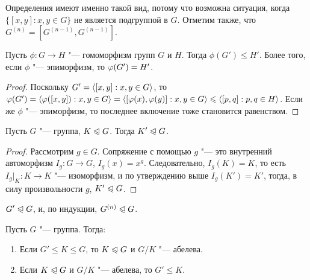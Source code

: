 \begin{note}
	Определения имеют именно такой вид, потому что возможна ситуация, когда $\{[x, y]: x, y \in G\}$ не является подгруппой в $G$. Отметим также, что $G^{(n)} = [G^{(n - 1)}, G^{(n - 1)}]$.
\end{note}

\begin{proposition}
	Пусть $\phi: G \to H$ "--- гомоморфизм групп $G$ и $H$. Тогда $\phi(G') \le H'$. Более того, если $\phi$ "--- эпиморфизм, то $\phi(G') \hm= H'$.
\end{proposition}

\begin{proof}
	Поскольку $G' = \langle[x, y]: x, y \in G\rangle$, то $\phi(G') \hm= \gl\phi([x, y]): x, y \in G\gr \hm= \gl[\phi(x), \phi(y)]: x, y \in G\gr \le \gl[p, q]: p, q \hm\in H\gr$. Если же $\phi$ "--- эпиморфизм, то последнее включение тоже становится равенством.
\end{proof}

\begin{corollary}
	Пусть $G$ "--- группа, $K \trianglelefteqslant G$. Тогда $K' \trianglelefteqslant G$.
\end{corollary}

\begin{proof}
	Рассмотрим $g \in G$. Сопряжение с помощью $g$ "--- это внутренний автоморфизм $I_g: G \to G$, $I_g(x) = x^g$. Следовательно, $I_g(K) = K$, то есть $I_g|_K : K \to K$ "--- изоморфизм, и по утверждению выше $I_g(K') = K'$, тогда, в силу произвольности $g$, $K' \trianglelefteqslant G$.
\end{proof}

\begin{corollary}
	$G' \trianglelefteqslant G$, и, по индукции, $G^{(n)} \trianglelefteqslant G$.
\end{corollary}

\begin{theorem} Пусть $G$ "--- группа. Тогда:
	\begin{enumerate}
		\item Если $G' \le K \le G$, то $K \trianglelefteqslant G$ и $G / K$ "--- абелева.
		\item Если $K \trianglelefteqslant G$ и $G / K$ "--- абелева, то $G' \le K$.
	\end{enumerate}
\end{theorem}

